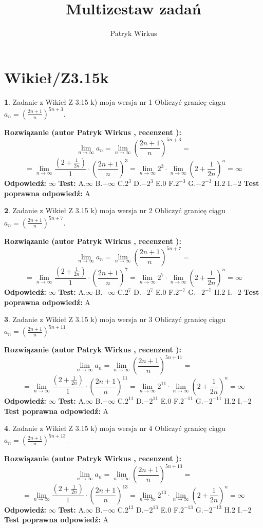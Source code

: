 \documentclass[12pt, a4paper]{article}
\title{Multizestaw zadań}
\author{Patryk Wirkus}
\date{}
\theoremstyle{definition} %
\newtheorem{zad}{}
\newcommand{\kategoria}[1]{\section{#1}}
\newcommand{\zadStart}[1]{\begin{zad}#1\newline}
\newcommand{\zadStop}{\end{zad}}
\newcommand{\rozwStart}[2]{\noindent \textbf{Rozwiązanie (autor #1 , recenzent #2): }\newline}
\newcommand{\rozwStop}{\newline}
\newcommand{\odpStart}{\noindent \textbf{Odpowiedź:}\newline}
\newcommand{\odpStop}{\newline}
\newcommand{\testStart}{\noindent \textbf{Test:}\newline}
\newcommand{\testStop}{\newline}
\newcommand{\kluczStart}{\noindent \textbf{Test poprawna odpowiedź:}\newline}
\newcommand{\kluczStop}{\newline}
\begin{document}
\maketitle

\kategoria{Wikieł/Z3.15k}


\zadStart{Zadanie z Wikieł Z 3.15 k) moja wersja nr 1}
Obliczyć granicę ciągu $a_{n}=(\frac{2n+1}{n})^{5n+3}$.
\zadStop
\rozwStart{Patryk Wirkus}{}
$$\lim\limits_{n\to\infty} a_{n} = \lim\limits_{n\to\infty}(\frac{2n+1}{n})^{5n+3}=$$
$$=\lim\limits_{n\to\infty}\frac{(2+\frac{1}{2n})}{1} \cdot (\frac{2n+1}{n})^{3} = \lim\limits_{n\to\infty} 2^{3} \cdot \lim\limits_{n\to\infty} (2+\frac{1}{2n})^{n} = \infty$$
\rozwStop
\odpStart
$\infty$
\odpStop
\testStart
A.$\infty$
B.$-\infty$
C.$2^{3}$
D.$-2^{3}$
E.$0$
F.$2^{-3}$
G.$-2^{-3}$
H.$2$
I.$-2$
\testStop
\kluczStart
A
\kluczStop



\zadStart{Zadanie z Wikieł Z 3.15 k) moja wersja nr 2}
Obliczyć granicę ciągu $a_{n}=(\frac{2n+1}{n})^{5n+7}$.
\zadStop
\rozwStart{Patryk Wirkus}{}
$$\lim\limits_{n\to\infty} a_{n} = \lim\limits_{n\to\infty}(\frac{2n+1}{n})^{5n+7}=$$
$$=\lim\limits_{n\to\infty}\frac{(2+\frac{1}{2n})}{1} \cdot (\frac{2n+1}{n})^{7} = \lim\limits_{n\to\infty} 2^{7} \cdot \lim\limits_{n\to\infty} (2+\frac{1}{2n})^{n} = \infty$$
\rozwStop
\odpStart
$\infty$
\odpStop
\testStart
A.$\infty$
B.$-\infty$
C.$2^{7}$
D.$-2^{7}$
E.$0$
F.$2^{-7}$
G.$-2^{-7}$
H.$2$
I.$-2$
\testStop
\kluczStart
A
\kluczStop



\zadStart{Zadanie z Wikieł Z 3.15 k) moja wersja nr 3}
Obliczyć granicę ciągu $a_{n}=(\frac{2n+1}{n})^{5n+11}$.
\zadStop
\rozwStart{Patryk Wirkus}{}
$$\lim\limits_{n\to\infty} a_{n} = \lim\limits_{n\to\infty}(\frac{2n+1}{n})^{5n+11}=$$
$$=\lim\limits_{n\to\infty}\frac{(2+\frac{1}{2n})}{1} \cdot (\frac{2n+1}{n})^{11} = \lim\limits_{n\to\infty} 2^{11} \cdot \lim\limits_{n\to\infty} (2+\frac{1}{2n})^{n} = \infty$$
\rozwStop
\odpStart
$\infty$
\odpStop
\testStart
A.$\infty$
B.$-\infty$
C.$2^{11}$
D.$-2^{11}$
E.$0$
F.$2^{-11}$
G.$-2^{-11}$
H.$2$
I.$-2$
\testStop
\kluczStart
A
\kluczStop



\zadStart{Zadanie z Wikieł Z 3.15 k) moja wersja nr 4}
Obliczyć granicę ciągu $a_{n}=(\frac{2n+1}{n})^{5n+13}$.
\zadStop
\rozwStart{Patryk Wirkus}{}
$$\lim\limits_{n\to\infty} a_{n} = \lim\limits_{n\to\infty}(\frac{2n+1}{n})^{5n+13}=$$
$$=\lim\limits_{n\to\infty}\frac{(2+\frac{1}{2n})}{1} \cdot (\frac{2n+1}{n})^{13} = \lim\limits_{n\to\infty} 2^{13} \cdot \lim\limits_{n\to\infty} (2+\frac{1}{2n})^{n} = \infty$$
\rozwStop
\odpStart
$\infty$
\odpStop
\testStart
A.$\infty$
B.$-\infty$
C.$2^{13}$
D.$-2^{13}$
E.$0$
F.$2^{-13}$
G.$-2^{-13}$
H.$2$
I.$-2$
\testStop
\kluczStart
A
\kluczStop
\end{document}

